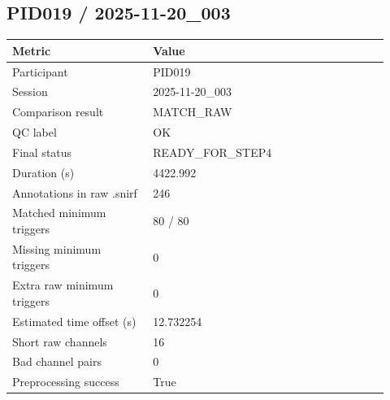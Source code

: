 \subsection*{PID019 / 2025-11-20\_003}
\begin{tabular}{p{0.34\linewidth}p{0.58\linewidth}}
\toprule
Metric & Value\\
\midrule
Participant & PID019\\
Session & 2025-11-20\_003\\
Comparison result & MATCH\_RAW\\
QC label & OK\\
Final status & READY\_FOR\_STEP4\\
Duration (s) & 4422.992\\
Annotations in raw .snirf & 246\\
Matched minimum triggers & 80 / 80\\
Missing minimum triggers & 0\\
Extra raw minimum triggers & 0\\
Estimated time offset (s) & 12.732254\\
Short raw channels & 16\\
Bad channel pairs & 0\\
Preprocessing success & True\\
\bottomrule
\end{tabular}
